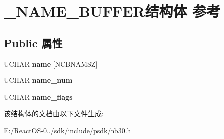 \hypertarget{struct___n_a_m_e___b_u_f_f_e_r}{}\section{\+\_\+\+N\+A\+M\+E\+\_\+\+B\+U\+F\+F\+E\+R结构体 参考}
\label{struct___n_a_m_e___b_u_f_f_e_r}
\subsection*{Public 属性}
\begin{DoxyCompactItemize}
\item 
\mbox{\label{struct___n_a_m_e___b_u_f_f_e_r_ac1f1e69abede6dfe7b96593cb30e538a}} 
U\+C\+H\+AR {\bfseries name} \mbox{[}N\+C\+B\+N\+A\+M\+SZ\mbox{]}
\item 
\mbox{\label{struct___n_a_m_e___b_u_f_f_e_r_a9a9ca3cfbece751d05457ae8eaa3e0e0}} 
U\+C\+H\+AR {\bfseries name\+\_\+num}
\item 
\mbox{\label{struct___n_a_m_e___b_u_f_f_e_r_a29aa05b22853882f64ed73d4dbd1cf0c}} 
U\+C\+H\+AR {\bfseries name\+\_\+flags}
\end{DoxyCompactItemize}


该结构体的文档由以下文件生成\+:\begin{DoxyCompactItemize}
\item 
E\+:/\+React\+O\+S-\/0../sdk/include/psdk/nb30.\+h\end{DoxyCompactItemize}
